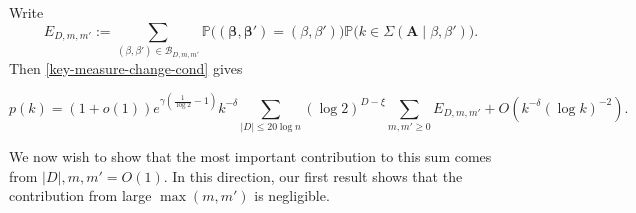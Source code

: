 \documentclass[11pt,reqno]{amsart}
\numberwithin{equation}{section}
\theoremstyle{definition}
\theoremstyle{remark}
\newcommand{\mb}{\mathbb}
\newcommand{\mbf}{\mathbf}
\def\boldbeta{\boldsymbol\beta}
\renewcommand{\le}{\leqslant}
\renewcommand{\ge}{\geqslant}
\begin{document}
 Write
\begin{equation}\label{edm-def} E_{D,m,m'} := \sum_{(\beta,\beta') \in \mathscr{B}_{D,m,m'}} \mb{P}\big((\boldbeta,\boldbeta') = (\beta,\beta')\big)  \mb{P}\big(k \in \Sigma(\mbf{A} \mid \beta,\beta')\big).\end{equation} 
Then \cref{key-measure-change-cond} gives

\begin{equation}\label{pk-walks-2} p(k) = (1 + o(1)) e^{\gamma(\frac{1}{\log 2} - 1)} k^{-\delta}  \sum_{|D| \le 20 \log n}(\log 2)^{D - \xi} \sum_{m, m' \ge 0} E_{D,m,m'}  +  O(k^{-\delta} (\log k)^{-2}).\end{equation}

We now wish to show that the most important contribution to this sum comes from $|D|, m,m' = O(1)$. In this direction, our first result shows that the contribution from large $\max(m,m')$ is negligible.
\end{document}
